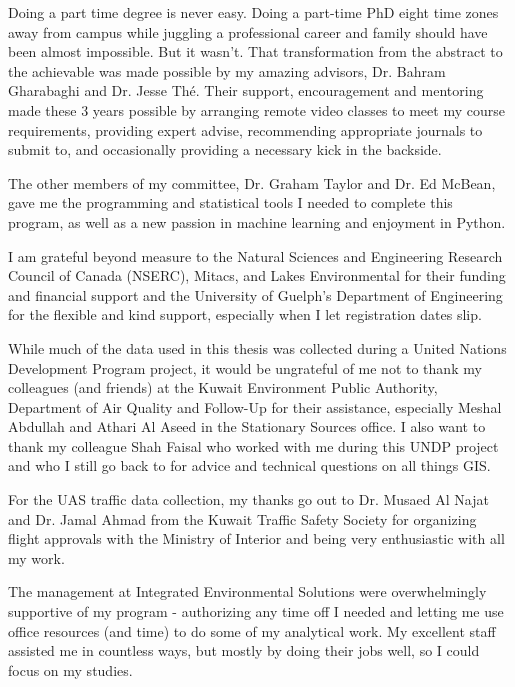 \begin{acknowledgements}\label{acknow}
\dsp

Doing a part time degree is never easy. Doing a part-time PhD eight time zones away from campus while juggling a professional career and family should have been almost impossible. But it wasn't. That transformation from the abstract to the achievable was made possible by my amazing advisors, Dr. Bahram Gharabaghi and Dr. Jesse Th\'e. Their support, encouragement and mentoring made these 3 years possible by arranging remote video classes to meet my course requirements, providing expert advise, recommending appropriate journals to submit to, and occasionally providing a necessary kick in the backside.

The other members of my committee, Dr. Graham Taylor and Dr. Ed McBean, gave me the programming and statistical tools I needed to complete this program, as well as a new passion in machine learning and enjoyment in Python.

I am grateful beyond measure to the Natural Sciences and Engineering Research Council of Canada (NSERC), Mitacs, and Lakes Environmental for their funding and financial support and the University of Guelph's Department of Engineering for the flexible and kind support, especially when I let registration dates slip.

While much of the data used in this thesis was collected during a United Nations Development Program project, it would be ungrateful of me not to thank my colleagues (and friends) at the Kuwait Environment Public Authority, Department of Air Quality and Follow-Up for their assistance, especially Meshal Abdullah and Athari Al Aseed in the Stationary Sources office. I also want to thank my colleague Shah Faisal who worked with me during this UNDP project and who I still go back to for advice and technical questions on all things GIS.

For the UAS traffic data collection, my thanks go out to Dr. Musaed Al Najat and Dr. Jamal Ahmad from the Kuwait Traffic Safety Society for organizing flight approvals with the Ministry of Interior and being very enthusiastic with all my work.

The management at Integrated Environmental Solutions were overwhelmingly supportive of my program - authorizing any time off I needed and letting me use office resources (and time) to do some of my analytical work. My excellent staff assisted me in countless ways, but mostly by doing their jobs well, so I could focus on my studies.


\end{acknowledgements}

